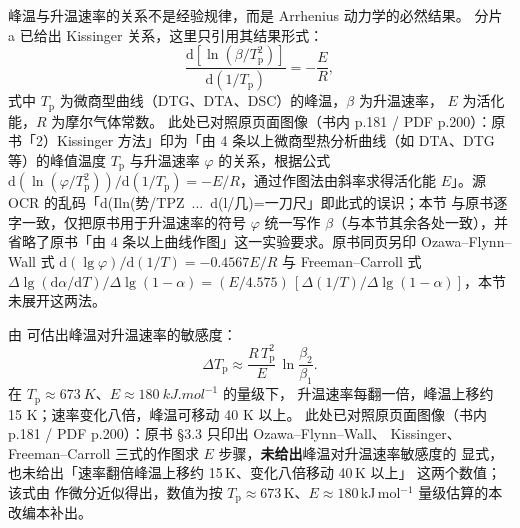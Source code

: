 \begin{principle}
峰温与升温速率的关系不是经验规律，而是 Arrhenius 动力学的必然结果。
分片 a 已给出 Kissinger 关系，这里只引用其结果形式：
\begin{equation}
\frac{\mathrm{d}\left[\ln(\beta/T_{\mathrm p}^{2})\right]}{\mathrm{d}(1/T_{\mathrm p})}
= -\frac{E}{R},
\label{eq:ch03b-kissinger}
\end{equation}
式中 $T_{\mathrm p}$ 为微商型曲线（DTG、DTA、DSC）的峰温，$\beta$ 为升温速率，
$E$ 为活化能，$R$ 为摩尔气体常数。
此处已对照原页面图像（书内 p.181 / PDF p.200）：原书「2）Kissinger 方法」印为「由 4 条以上微商型热分析曲线（如 DTA、DTG 等）的峰值温度 $T_{\mathrm p}$ 与升温速率 $\varphi$ 的关系，根据公式 $\mathrm{d}(\ln(\varphi/T_{\mathrm p}^{2}))/\mathrm{d}(1/T_{\mathrm p})=-E/R$，通过作图法由斜率求得活化能 $E$」。源 OCR 的乱码「d(Iln(势/TPZ\ ...\ d(l/几)=一刀尺」即此式的误识；本节 与原书逐字一致，仅把原书用于升温速率的符号 $\varphi$ 统一写作 $\beta$（与本节其余各处一致），并省略了原书「由 4 条以上曲线作图」这一实验要求。原书同页另印 Ozawa--Flynn--Wall 式 $\mathrm{d}(\lg\varphi)/\mathrm{d}(1/T)=-0.4567E/R$ 与 Freeman--Carroll 式 $\Delta\lg(\mathrm{d}\alpha/\mathrm{d}T)/\Delta\lg(1-\alpha)=(E/4.575)\,[\Delta(1/T)/\Delta\lg(1-\alpha)]$，本节未展开这两法。

由 可估出峰温对升温速率的敏感度：
\begin{equation}
\Delta T_{\mathrm p} \approx \frac{R\,T_{\mathrm p}^{2}}{E}\,\ln\frac{\beta_2}{\beta_1}.
\label{eq:ch03b-dTp}
\end{equation}
在 $T_{\mathrm p}\approx\qty{673}{K}$、$E\approx\qty{180}{kJ.mol^{-1}}$ 的量级下，
升温速率每翻一倍，峰温上移约 15 K；速率变化八倍，峰温可移动 40 K 以上。
此处已对照原页面图像（书内 p.181 / PDF p.200）：原书 §3.3 只印出 Ozawa--Flynn--Wall、
Kissinger、Freeman--Carroll 三式的作图求 $E$ 步骤，\textbf{未给出}峰温对升温速率敏感度的
显式，也未给出「速率翻倍峰温上移约 15\,K、变化八倍移动 40\,K 以上」
这两个数值；该式由 作微分近似得出，数值为按
$T_{\mathrm p}\approx673$\,K、$E\approx180$\,kJ\,mol$^{-1}$ 量级估算的本改编本补出。


\end{principle}
